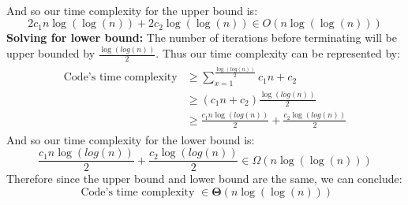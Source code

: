 \documentclass[12pt]{article}
\begin{document}
\begin{adjustwidth}{0em}{0pt}
\begin{align*}
\begin{aligned}
    \end{aligned}
\end{align*}
And so our time complexity for the upper bound is:
\[ 2c_1n\log(\log(n))+ 2c_2\log(\log(n)) \in O(n\log(\log(n))) \]
\textbf{Solving for lower bound:} The number of iterations before terminating will be upper bounded by $\frac{\log(log(n))}{2}$. Thus our time complexity can be represented by:
\begin{align*}
    \begin{aligned}
       \text{Code's time complexity} &\geq \sum^{\frac{\log(log(n))}{2}}_{x=1}c_1n + c_2   \\
       &\geq (c_1n + c_2)\frac{\log(log(n))}{2} \\
       &\geq \frac{c_1n\log(log(n))}{2}+ \frac{c_2\log(log(n))}{2}
    \end{aligned}
\end{align*}
And so our time complexity for the lower bound is:
\[ \frac{c_1n\log(log(n))}{2}+ \frac{c_2\log(log(n))}{2} \in \Omega(n\log(\log(n))) \]
Therefore since the upper bound and lower bound are the same, we can conclude:
\[ \text{ Code's time complexity  } \in \bm{\Theta}(n\log(\log(n))) \]
\end{adjustwidth}
\end{document}
